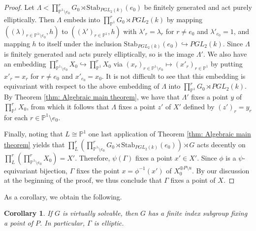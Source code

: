 \documentclass[12pt]{article}
\newtheorem{cor}[thm]{Corollary}
\theoremstyle{definition}
\begin{document}
\begin{proof}
    Let $\Lambda < \prod_{\mathbb{P}^1 \setminus e_0}^rG_0 \rtimes \mathrm{Stab}_{PGL_2(k)}(e_0)$ be finitely generated and act purely elliptically. Then $\Lambda$ embeds into $ \prod_{\mathbb{P}^1}^rG_0 \rtimes PGL_2(k)$ by mapping $((\lambda)_{r \in \mathbb{P}^1 \setminus e_0}, h)$ to $((\lambda')_{r \in \mathbb{P}^1}, h)$ with $\lambda'_r = \lambda_r$ for $r \neq e_0$ and $\lambda'_{e_0} = 1$, and mapping $h$ to itself under the inclusion $\mathrm{Stab}_{PGL_2(k)}(e_0) \hookrightarrow PGL_2(k)$. Since $\Lambda$ is finitely generated and acts purely elliptically, so is the image $\Lambda'$. We also have an embedding $\prod_{\mathbb{P}^1 \setminus e_0}^r X_0 \hookrightarrow \prod_{\mathbb{P}^1}^r X_0$ via $(x_r)_{r \in \mathbb{P}^1 \setminus e_0} \mapsto (x'_r)_{r \in \mathbb{P}^1}$ by putting $x'_r = x_r$ for $r \neq e_0$ and $x'_{e_0} = x_0$. It is not difficult to see that this embedding is equivariant with respect to the above embedding of $\Lambda$ into $\prod_{\mathbb{P}^1}^rG_0 \rtimes PGL_2(k)$. By Theorem \ref{thm: Algebraic main theorem}, we have that $\Lambda'$ fixes a point $y$ of $\prod_{\mathbb{P}^1}^r X_0$, from which it follows that $\Lambda$ fixes a point $z'$ of $X'$ defined by $(z')_r = y_r$ for each $r \in \mathbb{P}^1 \setminus e_0$.
    
    Finally, noting that $L \cong \mathbb{P}^1$ one last application of Theorem \ref{thm: Algebraic main theorem} yields that $\prod_L^{r}  (\prod_{\mathbb{P}^1 \setminus e_0}^rG_0 \rtimes \mathrm{Stab}_{PGL_2(k)}(e_0)) \rtimes  G$ acts decently on $\prod_L^r ( \prod_{\mathbb{P}^1 \setminus e_0}^r X_0) = X'$. Therefore, $\psi(\Gamma)$ fixes a point $x' \in X'$. Since $\phi$ is a $\psi$-equivariant bijection, $\Gamma$ fixes the point $x = \phi^{-1}(x')$ of $X_0^{\oplus P \setminus u}$. By our discussion at the beginning of the proof, we thus conclude that $\Gamma$ fixes a point of $X$. 
\end{proof} 

As a corollary, we obtain the following.

\begin{cor}
    \label{cor: virtually solvable implies elliptic}
    If $G$ is virtually solvable, then $G$ has a finite index subgroup fixing a point of $P$. In particular, $\Gamma$ is elliptic. 
\end{cor}
\end{document}
